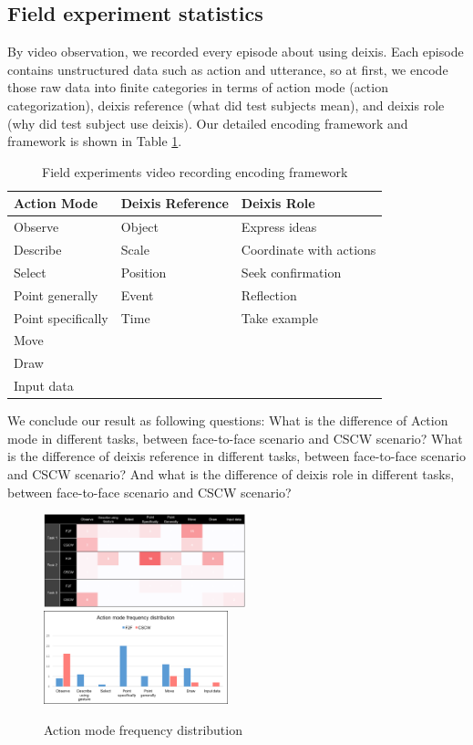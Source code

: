 \documentclass[12pt,twoside]{article}
\begin{document}
\subsection{Field experiment statistics}
\label{sec:field}
By video observation, we recorded every episode about using deixis. Each episode contains unstructured data such as action and utterance, so at first, we encode those raw data into finite categories in terms of action mode (action categorization), deixis reference (what did test subjects mean), and deixis role (why did test subject use deixis). Our detailed encoding framework and framework is shown in Table \ref{framework}.

\begin{table}
\begin{tabular}{p{6cm}p{6cm}p{4.6cm}}
\hline
Action Mode & Deixis Reference & Deixis Role\\
\hline
Observe & Object & Express ideas\\
Describe & Scale & Coordinate with actions\\
Select & Position & Seek confirmation\\
Point generally & Event & Reflection \\
Point specifically & Time & Take example \\
Move & & \\
Draw & & \\
Input data & & \\
\hline
\end{tabular}
\caption{Field experiments video recording encoding framework}
\label{framework}
\end{table}

We conclude our result as following questions: What is the difference of Action mode in different tasks, between face-to-face scenario and CSCW scenario? What is the difference of deixis reference in different tasks, between face-to-face scenario and CSCW scenario? And what is the difference of deixis role in different tasks, between face-to-face scenario and CSCW scenario?

\begin{figure}
\includegraphics[width = 0.522\textwidth]{action_mode_a.png}
\includegraphics[width = 0.476\textwidth]{action_mode_b.png}
\caption{Action mode frequency distribution}
\label{actionmode}
\end{figure}
\end{document}
